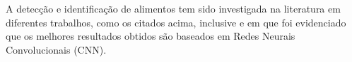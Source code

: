 A detecção e identificação de alimentos tem sido investigada na literatura em diferentes trabalhos, como os citados acima, inclusive \cite{aguilar2017food} e \cite{pouladzadeh2017cloud} em que foi evidenciado que os melhores resultados obtidos são baseados em Redes Neurais Convolucionais (CNN).






